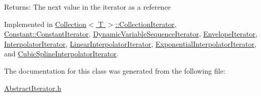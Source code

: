 \begin{Desc}
\item[Returns:]The next value in the iterator as a reference \end{Desc}


Implemented in \hyperlink{classCollection_1_1CollectionIterator_a3}{Collection$<$ T $>$::Collection\-Iterator}, \hyperlink{classConstant_1_1ConstantIterator_a3}{Constant::Constant\-Iterator}, \hyperlink{classDynamicVariableSequenceIterator_a4}{Dynamic\-Variable\-Sequence\-Iterator}, \hyperlink{classEnvelopeIterator_a4}{Envelope\-Iterator}, \hyperlink{classInterpolatorIterator_a4}{Interpolator\-Iterator}, \hyperlink{classLinearInterpolatorIterator_a2}{Linear\-Interpolator\-Iterator}, \hyperlink{classExponentialInterpolatorIterator_a2}{Exponential\-Interpolator\-Iterator}, and \hyperlink{classCubicSplineInterpolatorIterator_a2}{Cubic\-Spline\-Interpolator\-Iterator}.

The documentation for this class was generated from the following file:\begin{CompactItemize}
\item 
\hyperlink{AbstractIterator_8h}{Abstract\-Iterator.h}\end{CompactItemize}
